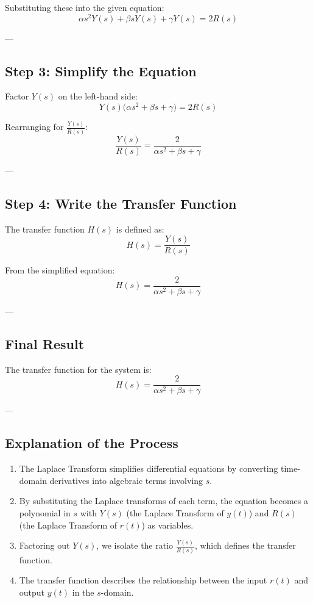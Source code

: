 \documentclass[12pt]{article}
\begin{document}
Substituting these into the given equation:
\[
\alpha s^2 Y(s) + \beta s Y(s) + \gamma Y(s) = 2R(s)
\]

---

\subsection*{Step 3: Simplify the Equation}

Factor \( Y(s) \) on the left-hand side:
\[
Y(s) \big( \alpha s^2 + \beta s + \gamma \big) = 2R(s)
\]

Rearranging for \( \frac{Y(s)}{R(s)} \):
\[
\frac{Y(s)}{R(s)} = \frac{2}{\alpha s^2 + \beta s + \gamma}
\]

---

\subsection*{Step 4: Write the Transfer Function}

The transfer function \( H(s) \) is defined as:
\[
H(s) = \frac{Y(s)}{R(s)}
\]

From the simplified equation:
\[
H(s) = \frac{2}{\alpha s^2 + \beta s + \gamma}
\]

---

\subsection*{Final Result}

The transfer function for the system is:
\[
H(s) = \frac{2}{\alpha s^2 + \beta s + \gamma}
\]

---

\subsection*{Explanation of the Process}

\begin{enumerate}
    \item The Laplace Transform simplifies differential equations by converting time-domain derivatives into algebraic terms involving \( s \).
    \item By substituting the Laplace transforms of each term, the equation becomes a polynomial in \( s \) with \( Y(s) \) (the Laplace Transform of \( y(t) \)) and \( R(s) \) (the Laplace Transform of \( r(t) \)) as variables.
    \item Factoring out \( Y(s) \), we isolate the ratio \( \frac{Y(s)}{R(s)} \), which defines the transfer function.
    \item The transfer function describes the relationship between the input \( r(t) \) and output \( y(t) \) in the \( s \)-domain.
\end{enumerate}
\end{document}
